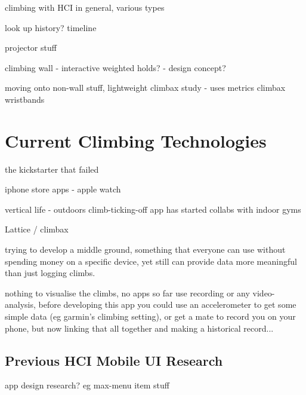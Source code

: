 climbing with HCI in general, various types

look up history? timeline

projector stuff

climbing wall - interactive weighted holds? - design concept?


moving onto non-wall stuff, lightweight
climbax study - uses metrics
climbax wristbands



\section{Current Climbing Technologies}
the kickstarter that failed

iphone store apps - apple watch

vertical life - outdoors climb-ticking-off app has started collabs with indoor gyms

Lattice / climbax


trying to develop a middle ground, something that everyone can use without spending money on a specific device, yet still can provide data more meaningful than just logging climbs.

nothing to visualise the climbs, no apps so far use recording or any video-analysis, before developing this app you could use an accelerometer to get some simple data (eg garmin's climbing setting), or get a mate to record you on your phone, but now linking that all together and making a historical record...






\subsection{Previous HCI Mobile UI Research}

app design research?
eg max-menu item stuff





